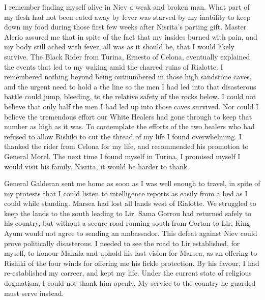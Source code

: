 \documentclass{article}
\begin{document}
I remember finding myself alive in Niev a weak and broken man. What part of my flesh had not been eated away by fever was starved by my inability to keep down my food during those first few weeks after Nisrita's parting gift. Master Alerio assured me that in spite of the fact that my insides burned with pain, and my body still ached with fever, all was as it should be, that I would likely survive. The Black Rider from Turina, Ernesto of Celona, eventually explained the events that led to my waking amid the charred ruins of Rialotte. I remembered nothing beyond being outnumbered in those high sandstone caves, and the urgent need to hold a the line so the men I had led into that disasterous battle could jump, bleeding, to the relative safety of the rocks below. I could not believe that only half the men I had led up into those caves survived. Nor could I believe the tremendous effort our White Healers had gone through to keep that number as high as it was. To contemplate the efforts of the two healers who had refused to allow Rishiki to cut the thread of my life I found overwhelming. I thanked the rider from Celona for my life, and recommended his promotion to General Morel. The next time I found myself in Turina, I promised myself I would visit his family. Nisrita, it would be harder to thank. 

General Galderan sent me home as soon as I was well enough to travel, in spite of my protests that I could listen to intelligence reports as easily from a bed as I could while standing. Marsea had lost all lands west of Rialotte. We struggled to keep the lands to the south leading to Lir. Sama Gorrou had returned safely to his country, but without a secure road running south from Cortan to Lir, King Ayum would not agree to sending an ambassador. This defeat against Niev could prove politically disasterous.  I needed to see the road to Lir established, for myself, to honour Makala and uphold his last vision for Marsea, as an offering to Rishiki of the four winds for offering me his fickle protection. By his favour, I had re-established my carreer, and kept my life. Under the current state of religious dogmatism, I could not thank him openly. My service to the country he guarded must serve instead. 
\end{document}
